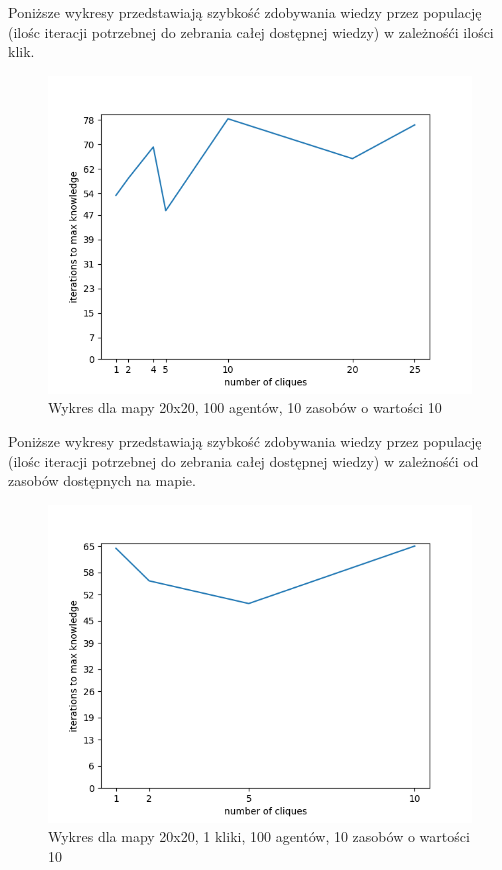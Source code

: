 Poniższe wykresy przedstawiają szybkość zdobywania wiedzy przez populację (ilośc iteracji potrzebnej do zebrania całej dostępnej wiedzy) w zależnośći ilości klik.
\nopagebreak

\begin{figure}[H]
	\centering
	\includegraphics[width=130mm]{wykresy/different_number_of_cliques_map-20x20_graph-10-10_res-10-10_p-1.png}
	\caption{Wykres dla mapy 20x20, 100 agentów, 10 zasobów o wartości 10}
\end{figure}

Poniższe wykresy przedstawiają szybkość zdobywania wiedzy przez populację (ilośc iteracji potrzebnej do zebrania całej dostępnej wiedzy) w zależnośći od zasobów dostępnych na mapie.
\nopagebreak

\begin{figure}[H]
	\centering
	\includegraphics[width=130mm]{wykresy/different_number_of_cliques_map-20x20_graph-1-100_res-10-10_p-1.png}
	\caption{Wykres dla mapy 20x20, 1 kliki, 100 agentów, 10 zasobów o wartości 10}
\end{figure}

